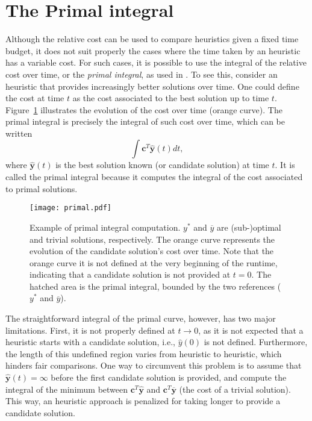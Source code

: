 \section{The Primal integral}\label{sec:primal-integral}


Although the relative cost can be used to compare heuristics given a fixed time budget, it does not suit properly the cases where the time taken by an heuristic has a variable cost.
For such cases, it is possible to use the integral of the relative cost over time, or the \emph{primal integral}, as used in .
To see this, consider an heuristic that provides increasingly better solutions over time.
One could define the cost at time $t$ as the cost associated to the best solution up to time $t$.
Figure~\ref{fig:primal-curve} illustrates the evolution of the cost over time (orange curve).
The primal integral is precisely the integral of such cost over time, which can be written \[
    \int \bm{c}^T \hat{\bm{y}}(t) dt
,\] where $\hat{\bm{y}}(t)$ is the best solution known (or candidate solution) at time $t$.
It is called the primal integral because it computes the integral of the cost associated to primal solutions.

\begin{figure}[h]
    \centering
    \texttt{[image: primal.pdf]}
    \caption{Example of primal integral computation. $y^*$ and $\overline{y}$ are (sub-)optimal and trivial solutions, respectively. The orange curve represents the evolution of the candidate solution's cost over time. Note that the orange curve it is not defined at the very beginning of the runtime, indicating that a candidate solution is not provided at $t=0$. The hatched area is the primal integral, bounded by the two references ($y^*$ and $\overline{y}$).}
    \label{fig:primal-curve}
\end{figure}

The straightforward integral of the primal curve, however, has two major limitations.
First, it is not properly defined at $t \to 0$, as it is not expected that a heuristic starts with a candidate solution, i.e., $\hat{y}(0)$ is not defined.
Furthermore, the length of this undefined region varies from heuristic to heuristic, which hinders fair comparisons.
One way to circumvent this problem is to assume that $\hat{\bm{y}}(t) = \infty$ before the first candidate solution is provided, and compute the integral of the minimum between $\bm{c}^T \hat{\bm{y}}$ and $\bm{c}^T\overline{\bm{y}}$ (the cost of a trivial solution).
This way, an heuristic approach is penalized for taking longer to provide a candidate solution.

